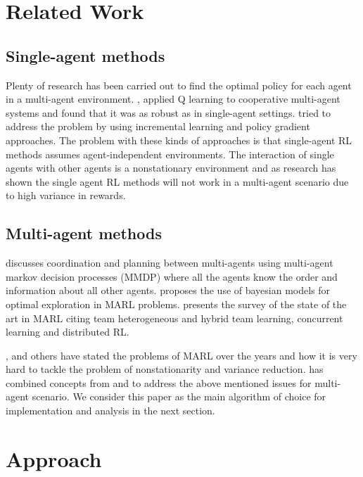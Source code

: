 \documentclass{article}
\begin{document}
\section{Related Work}
\subsection{Single-agent methods}
Plenty of research has been carried out to find the optimal policy for each agent in a multi-agent environment. \cite{sandholm1996},\cite{claus1998dynamics} applied Q learning to cooperative multi-agent systems and found that it was as robust as in single-agent settings. 
\cite{buffet2007} tried to address the problem by using incremental learning and policy gradient approaches. The problem with these kinds of approaches is that single-agent RL methods assumes agent-independent environments. The interaction of single agents with other agents is a nonstationary environment and as research has shown the single agent RL methods will not work in a multi-agent scenario due to high variance in rewards.   

\subsection{Multi-agent methods}

\cite{boutilier1996planning} discusses coordination and planning between multi-agents using multi-agent markov decision processes (MMDP) where all the agents know the order and information about all other agents. \cite{chalkiadakis2003coordination} proposes the use of bayesian models for optimal exploration in MARL problems. \cite{panait2005cooperative} presents the survey of the state of the art in MARL citing team heterogeneous and hybrid team learning, concurrent learning and distributed RL.

\cite{busoniu2008comprehensive}, \cite{bucsoniu2010multi} and others have stated the problems of MARL over the years and how it is very hard to tackle the problem  of nonstationarity and variance reduction. \cite{maddpg} has combined concepts from \cite{suttonbarto1998rl} and \cite{lillicrap2015continuous} to address the above mentioned issues for multi-agent scenario. We consider this paper as the main algorithm of choice for implementation and analysis in the next section.
\section{Approach}
\end{document}
